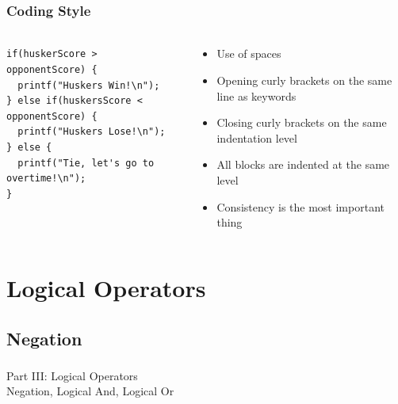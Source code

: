 \documentclass[]{beamer}
\begin{document}
\begin{frame}[fragile]
  \frametitle{Coding Style}
  \framesubtitle{}

\begin{columns}[T] %
\begin{column}{.60\textwidth}
\begin{verbatim}
if(huskerScore > opponentScore) {
  printf("Huskers Win!\n");
} else if(huskersScore < opponentScore) {
  printf("Huskers Lose!\n");
} else {
  printf("Tie, let's go to overtime!\n");
}
\end{verbatim}
\end{column}%
\hfill
\begin{column}{.4\textwidth}
{\footnotesize
\begin{itemize}[<+->]
  \item Use of spaces
  \item Opening curly brackets on the same line as keywords
  \item Closing curly brackets on the same indentation level
  \item All blocks are indented at the same level
  \item Consistency is the most important thing
\end{itemize}
}
\end{column}%
\end{columns}


\end{frame}


\section{Logical Operators}

\subsection{Negation}
\begin{frame}
    \frametitle{}
    \framesubtitle{}
    
    \begin{center}
    {\Huge Part III: Logical Operators}\\
    {\Large Negation, Logical And, Logical Or}
    \end{center}

\end{frame}
\end{document}
